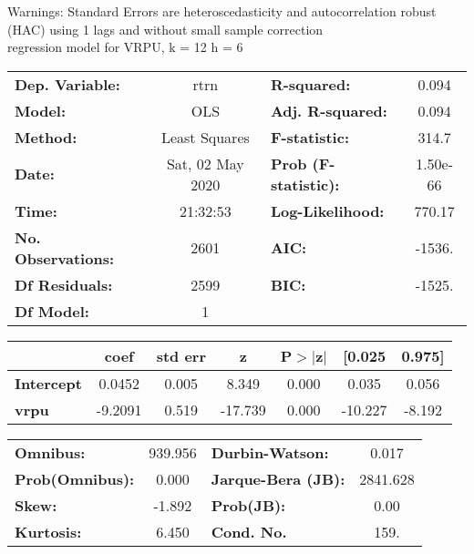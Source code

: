 Warnings: \newline
 [1] Standard Errors are heteroscedasticity and autocorrelation robust (HAC) using 1 lags and without small sample correction\\ 

regression model for VRPU, k = 12 h = 6\begin{center}
\begin{tabular}{lclc}
\toprule
\textbf{Dep. Variable:}    &       rtrn       & \textbf{  R-squared:         } &     0.094   \\
\textbf{Model:}            &       OLS        & \textbf{  Adj. R-squared:    } &     0.094   \\
\textbf{Method:}           &  Least Squares   & \textbf{  F-statistic:       } &     314.7   \\
\textbf{Date:}             & Sat, 02 May 2020 & \textbf{  Prob (F-statistic):} &  1.50e-66   \\
\textbf{Time:}             &     21:32:53     & \textbf{  Log-Likelihood:    } &    770.17   \\
\textbf{No. Observations:} &        2601      & \textbf{  AIC:               } &    -1536.   \\
\textbf{Df Residuals:}     &        2599      & \textbf{  BIC:               } &    -1525.   \\
\textbf{Df Model:}         &           1      & \textbf{                     } &             \\
\bottomrule
\end{tabular}
\begin{tabular}{lcccccc}
                   & \textbf{coef} & \textbf{std err} & \textbf{z} & \textbf{P$> |$z$|$} & \textbf{[0.025} & \textbf{0.975]}  \\
\midrule
\textbf{Intercept} &       0.0452  &        0.005     &     8.349  &         0.000        &        0.035    &        0.056     \\
\textbf{vrpu}      &      -9.2091  &        0.519     &   -17.739  &         0.000        &      -10.227    &       -8.192     \\
\bottomrule
\end{tabular}
\begin{tabular}{lclc}
\textbf{Omnibus:}       & 939.956 & \textbf{  Durbin-Watson:     } &    0.017  \\
\textbf{Prob(Omnibus):} &   0.000 & \textbf{  Jarque-Bera (JB):  } & 2841.628  \\
\textbf{Skew:}          &  -1.892 & \textbf{  Prob(JB):          } &     0.00  \\
\textbf{Kurtosis:}      &   6.450 & \textbf{  Cond. No.          } &     159.  \\
\bottomrule
\end{tabular}
\end{center}

